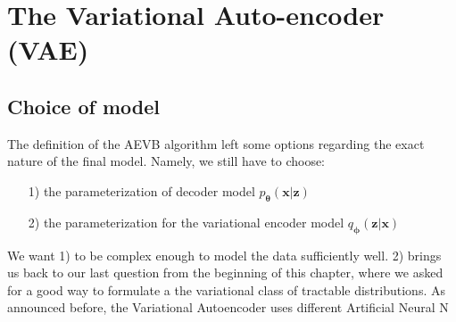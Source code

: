 \documentclass[12pt]{report}
\theoremstyle{definition}
\begin{document}
\section{The Variational Auto-encoder (VAE)}
\subsection{Choice of model}

The definition of the AEVB algorithm left some options regarding the exact nature of the final model. Namely, we still have to choose:
\begin{itemize}
\item[1)] the parameterization of decoder model $p_{\pmb{\theta}}(\mathbf{x}|\mathbf{z})$
\item[2)] the parameterization for the variational encoder model $q_{\pmb{\phi}}(\mathbf{z}|\mathbf{x})$
\end{itemize}
We want 1) to be complex enough to model the data sufficiently well. 2) brings us back to our last question from the beginning of this chapter, where we asked for a good way to formulate a the variational class of tractable distributions. As announced before, the Variational Autoencoder uses different Artificial Neural N\\
\end{document}
